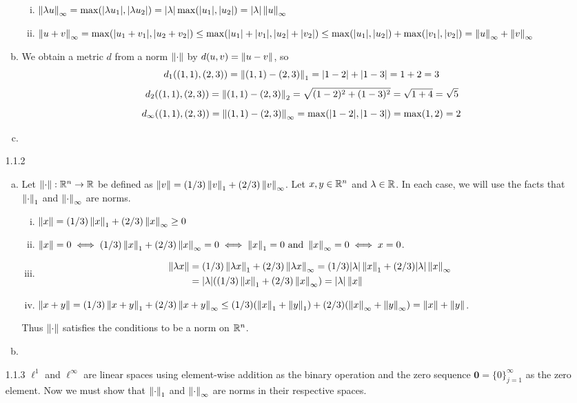\documentclass[../../Solutions.tex]{subfiles}
\begin{document}
\begin{itemize}
\begin{enumerate}[(a)]
\begin{enumerate}[(i)]
					\item $\left\lVert\lambda u\right\rVert_\infty = \max(|\lambda u_1|,|\lambda u_2|) = |\lambda|\max(|u_1|,|u_2|) = |\lambda|\left\lVert u\right\rVert_\infty$
					\item $\left\lVert u+v\right\rVert_\infty = \max(|u_1+v_1|,|u_2+v_2|) \leq \max(|u_1|+|v_1|,|u_2|+|v_2|) \leq \max(|u_1|,|u_2|)+\max(|v_1|,|v_2|) = \left\lVert u\right\rVert_\infty+\left\lVert v\right\rVert_\infty$
				\end{enumerate}
			\item We obtain a metric $d$ from a norm $\left\lVert\cdot\right\rVert$ by $d(u,v) = \left\lVert u-v\right\rVert$, so
				$$ d_1((1,1),(2,3)) = \left\lVert(1,1)-(2,3)\right\rVert_1 = |1-2|+|1-3| = 1+2 = 3 $$
				$$ d_2((1,1),(2,3)) = \left\lVert(1,1)-(2,3)\right\rVert_2 = \sqrt{(1-2)^2+(1-3)^2} = \sqrt{1+4} = \sqrt{5} $$
				$$ d_\infty((1,1),(2,3)) = \left\lVert(1,1)-(2,3)\right\rVert_\infty = \max(|1-2|,|1-3|) = \max(1,2) = 2 $$
			\item %
		\end{enumerate}
	
	\item [1.1.2]
		\begin{enumerate}[(a)]
			\item Let $\left\lVert\cdot\right\rVert:\mathbb{R}^n \to \mathbb{R}$ be defined as $\left\lVert v\right\rVert = (1/3)\left\lVert v\right\rVert_1+(2/3)\left\lVert v\right\rVert_\infty$.
				Let $x,y \in \mathbb{R}^n$ and $\lambda \in \mathbb{R}$.
				In each case, we will use the facts that $\left\lVert\cdot\right\rVert_1$ and $\left\lVert\cdot\right\rVert_\infty$ are norms.
				
				\begin{enumerate}[(i)]
					\item $\left\lVert x\right\rVert = (1/3)\left\lVert x\right\rVert_1+(2/3)\left\lVert x\right\rVert_\infty \geq 0$
					\item $\left\lVert x\right\rVert = 0 \iff (1/3)\left\lVert x\right\rVert_1+(2/3)\left\lVert x\right\rVert_\infty = 0 \iff \left\lVert x\right\rVert_1 = 0 \text{ and } \left\lVert x\right\rVert_\infty = 0 \iff x = 0$.
					\item \begin{equation*} \begin{split}
						 \left\lVert\lambda x\right\rVert & = (1/3)\left\lVert\lambda x\right\rVert_1+(2/3)\left\lVert\lambda x\right\rVert_\infty = (1/3)|\lambda|\left\lVert x\right\rVert_1+(2/3)|\lambda|\left\lVert x\right\rVert_\infty \\
							 & = |\lambda|((1/3)\left\lVert x\right\rVert_1+(2/3)\left\lVert x\right\rVert_\infty) = |\lambda|\left\lVert x\right\rVert
					\end{split} \end{equation*}
					\item $\left\lVert x+y\right\rVert = (1/3)\left\lVert x+y\right\rVert_1+(2/3)\left\lVert x+y\right\rVert_\infty \leq (1/3)(\left\lVert x\right\rVert_1+\left\lVert y\right\rVert_1)+(2/3)(\left\lVert x\right\rVert_\infty+\left\lVert y\right\rVert_\infty) = \left\lVert x\right\rVert+\left\lVert y\right\rVert$.
				\end{enumerate}
				Thus $\left\lVert\cdot\right\rVert$ satisfies the conditions to be a norm on $\mathbb{R}^n$.
			\item %
		\end{enumerate}
	
	\item [1.1.3] $\ell^1$ and $\ell^\infty$ are linear spaces using element-wise addition as the binary operation and the zero sequence $\mathbf{0} = \{0\}_{j=1}^\infty$ as the zero element.
	Now we must show that $\left\lVert\cdot\right\rVert_1$ and $\left\lVert\cdot\right\rVert_\infty$ are norms in their respective spaces.
	
\end{itemize}
\end{document}
